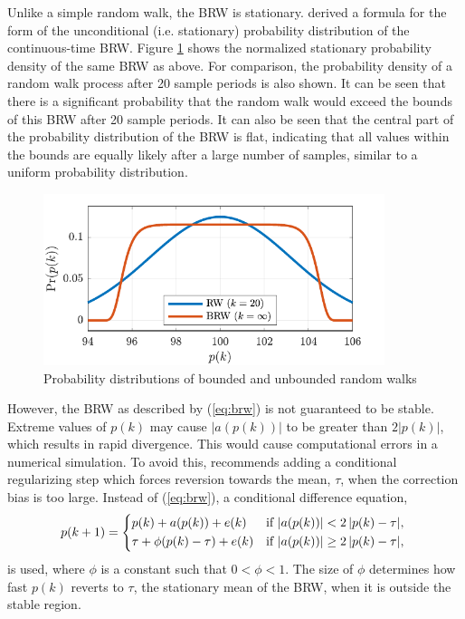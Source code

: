 Unlike a simple random walk, the \gls{BRW} is stationary. \cite{nicolau_stationary_2002} derived a formula for the form of the unconditional (i.e. stationary) probability distribution of the continuous-time \gls{BRW}. Figure \ref{fig:brw-pdf} shows the normalized stationary probability density of the same \gls{BRW} as above. For comparison, the probability density of a random walk process after 20 sample periods is also shown. It can be seen that there is a significant probability that the random walk would exceed the bounds of this \gls{BRW} after 20 sample periods. It can also be seen that the central part of the probability distribution of the \gls{BRW} is flat, indicating that all values within the bounds are equally likely after a large number of samples, similar to a uniform probability distribution.


\begin{figure}[htp]
	\centering
	\includegraphics[height=5cm]{images/brw_pdf.pdf}
	\caption{Probability distributions of bounded and unbounded random walks}
	\label{fig:brw-pdf}
\end{figure}

However, the \gls{BRW} as described by (\ref{eq:brw}) is not guaranteed to be stable. Extreme values of $p(k)$ may cause $|a(p(k))|$ to be greater than $2|p(k)|$, which results in rapid divergence. This would cause computational errors in a numerical simulation. To avoid this, \cite{nicolau_stationary_2002} recommends adding a conditional regularizing step which forces reversion towards the mean, $\tau$, when the correction bias is too large. Instead of (\ref{eq:brw}), a conditional difference equation,
\begin{equation} \label{eq:brw-reg}
	p(k+1) = \begin{cases*}
		p(k) + a(p(k)) + e(k) & if $\left|a(p(k)) \right| < 2\left| p(k) - \tau \right|$, \\
		\tau + \phi(p(k) - \tau) + e(k) & if $\left|a(p(k)) \right| \geq 2\left| p(k) - \tau \right|$,
	\end{cases*}
\end{equation}
is used, where $\phi$ is a constant such that $0<\phi<1$. The size of $\phi$ determines how fast $p(k)$ reverts to $\tau$, the stationary mean of the \gls{BRW}, when it is outside the stable region.

